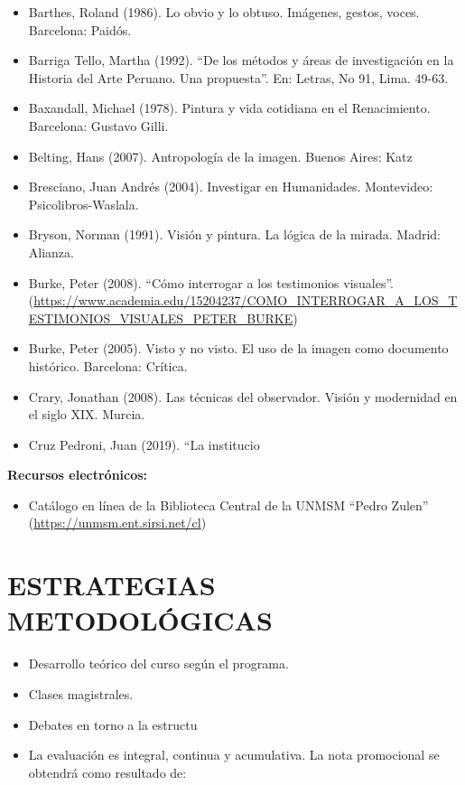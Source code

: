 \documentclass[a4paper]{article}
\begin{document}
\begin{itemize}
\item Barthes, Roland (1986). Lo obvio y lo obtuso. Imágenes, gestos, voces. Barcelona: Paidós.
\item Barriga Tello, Martha (1992). “De los métodos y áreas de investigación en la Historia del Arte Peruano. Una propuesta”. En: Letras, No 91, Lima. 49-63.
\item Baxandall, Michael (1978). Pintura y vida cotidiana en el Renacimiento. Barcelona: Gustavo Gilli.
\item Belting, Hans (2007). Antropología de la imagen. Buenos Aires: Katz
\item Bresciano, Juan Andrés (2004). Investigar en Humanidades. Montevideo: Psicolibros-Waslala.
\item Bryson, Norman (1991). Visión y pintura. La lógica de la mirada. Madrid: Alianza.
\item Burke, Peter (2008). “Cómo interrogar a los testimonios visuales”.  (\url{https://www.academia.edu/15204237/COMO\_INTERROGAR\_A\_LOS\_TESTIMONIOS\_VISUALES\_PETER\_BURKE})
\item Burke, Peter (2005). Visto y no visto. El uso de la imagen como documento histórico. Barcelona: Crítica.
\item Crary, Jonathan (2008). Las técnicas del observador. Visión y modernidad en el siglo XIX. Murcia.
\item Cruz Pedroni, Juan (2019). “La institucio
\end{itemize}
{\huge \bf Recursos electrónicos:}\\[0.3cm]
\begin{itemize}
\item Catálogo en línea de la Biblioteca Central de la UNMSM “Pedro Zulen”  (\url{https://unmsm.ent.sirsi.net/cl})
\end{itemize}
\section {ESTRATEGIAS METODOLÓGICAS}
\begin{itemize}
\item Desarrollo teórico del curso según el programa.
\item Clases magistrales.
\item Debates en torno a la estructu
\end{itemize}
\begin{itemize}
\item La evaluación es integral, continua y acumulativa. La nota promocional se obtendrá como resultado de:
\end{itemize}
\end{document}
